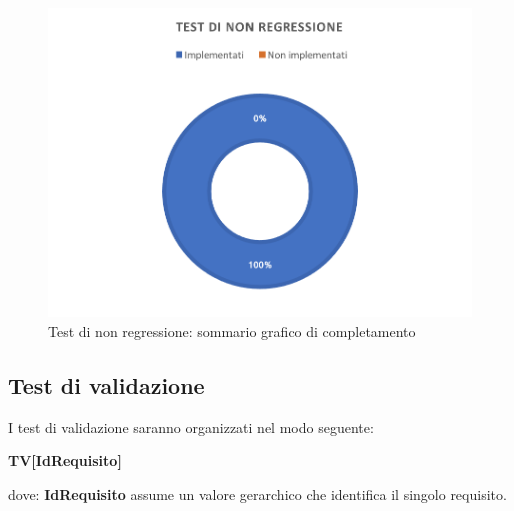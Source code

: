 \documentclass[../PianoDiQualifica_v4.0.0.tex]{subfiles}
\begin{document}
		\begin{figure}[!h]
			\centering
			\includegraphics{ImgTest/TNR.png}
			\caption{Test di non regressione: sommario grafico di completamento}
			\label{fig:pieTNR}
		\end{figure}


	\newpage
	\subsection{Test di validazione}
	I test di validazione saranno organizzati nel modo seguente:
	\begin{center}
		\textbf{TV[IdRequisito]}
	\end{center}
	dove:	
	\textbf{IdRequisito} assume un valore gerarchico che identifica il singolo requisito.

\end{document}
